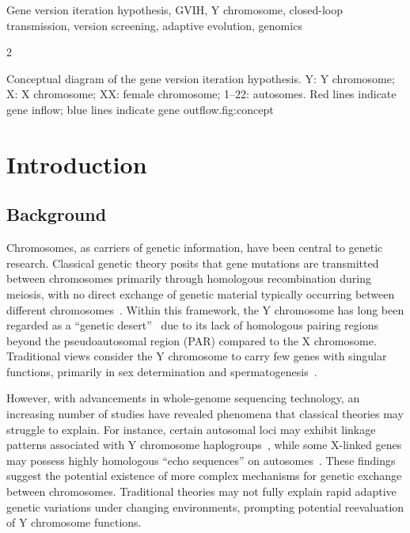 \documentclass{base}
\begin{document}
\begin{keywords}
Gene version iteration hypothesis, GVIH, Y chromosome, closed-loop transmission, version screening, adaptive evolution, genomics
\end{keywords}

\begin{multicols}{2}

{Conceptual diagram of the gene version iteration hypothesis. Y: Y chromosome; X: X chromosome; XX: female chromosome; 1--22: autosomes. Red lines indicate gene inflow; blue lines indicate gene outflow.}{fig:concept}

\section{Introduction}

\subsection{Background}
Chromosomes, as carriers of genetic information, have been central to genetic research. Classical genetic theory posits that gene mutations are transmitted between chromosomes primarily through homologous recombination during meiosis, with no direct exchange of genetic material typically occurring between different chromosomes~\cite{teplitz_introduction_1987}. Within this framework, the Y chromosome has long been regarded as a ``genetic desert''~\cite{charlesworth_degeneration_2000} due to its lack of homologous pairing regions beyond the pseudoautosomal region (PAR) compared to the X chromosome. Traditional views consider the Y chromosome to carry few genes with singular functions, primarily in sex determination and spermatogenesis~\cite{lahn_four_1999}.

However, with advancements in whole-genome sequencing technology, an increasing number of studies have revealed phenomena that classical theories may struggle to explain. For instance, certain autosomal loci may exhibit linkage patterns associated with Y chromosome haplogroups~\cite{rozen_remarkably_2009}, while some X-linked genes may possess highly homologous ``echo sequences'' on autosomes~\cite{emerson_extensive_2004}. These findings suggest the potential existence of more complex mechanisms for genetic exchange between chromosomes. Traditional theories may not fully explain rapid adaptive genetic variations under changing environments, prompting potential reevaluation of Y chromosome functions.


\end{multicols}
\end{document}

